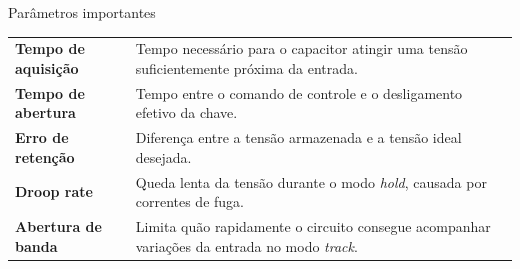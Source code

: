 \begin{frame}{Parâmetros importantes}
  \begin{tabular}{p{} p{}}
    \textbf{Tempo de aquisição} & Tempo necessário para o capacitor atingir uma tensão suficientemente próxima da entrada. \\[0.18cm]
    \textbf{Tempo de abertura} & Tempo entre o comando de controle e o desligamento efetivo da chave. \\[0.18cm]
    \textbf{Erro de retenção} & Diferença entre a tensão armazenada e a tensão ideal desejada. \\[0.18cm]
    \textbf{Droop rate} & Queda lenta da tensão durante o modo \textit{hold}, causada por correntes de fuga. \\[0.18cm]
    \textbf{Abertura de banda} & Limita quão rapidamente o circuito consegue acompanhar variações da entrada no modo \textit{track}. \\
  \end{tabular}
\end{frame}